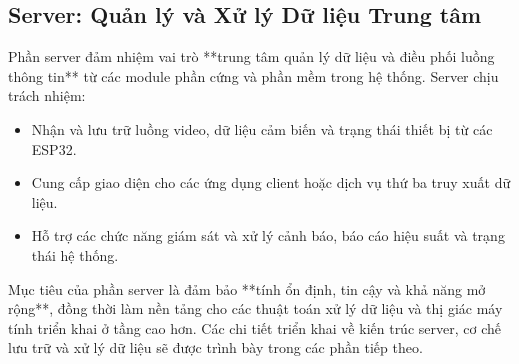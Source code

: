 \subsection{Server: Quản lý và Xử lý Dữ liệu Trung tâm}
\label{sec:server_overview}

Phần server đảm nhiệm vai trò **trung tâm quản lý dữ liệu và điều phối luồng thông tin** từ các module phần cứng và phần mềm trong hệ thống. Server chịu trách nhiệm:
\begin{itemize}
    \item Nhận và lưu trữ luồng video, dữ liệu cảm biến và trạng thái thiết bị từ các ESP32.
    \item Cung cấp giao diện cho các ứng dụng client hoặc dịch vụ thứ ba truy xuất dữ liệu.
    \item Hỗ trợ các chức năng giám sát và xử lý cảnh báo, báo cáo hiệu suất và trạng thái hệ thống.
\end{itemize}

Mục tiêu của phần server là đảm bảo **tính ổn định, tin cậy và khả năng mở rộng**, đồng thời làm nền tảng cho các thuật toán xử lý dữ liệu và thị giác máy tính triển khai ở tầng cao hơn. Các chi tiết triển khai về kiến trúc server, cơ chế lưu trữ và xử lý dữ liệu sẽ được trình bày trong các phần tiếp theo.

